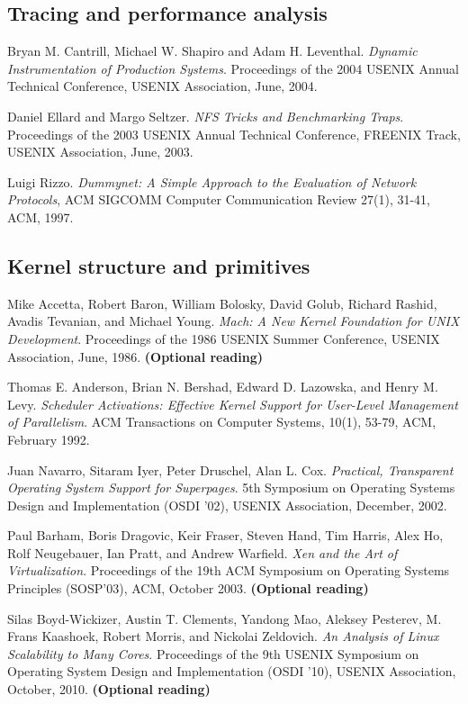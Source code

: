 \documentclass[a4paper,10pt]{article}
\begin{document}
\subsection*{Tracing and performance analysis}

Bryan M. Cantrill, Michael W. Shapiro and Adam H. Leventhal.  \textit{Dynamic
Instrumentation of Production Systems}.  Proceedings of the 2004 USENIX Annual
Technical Conference, USENIX Association, June, 2004.

\medskip
\noindent
Daniel Ellard and Margo Seltzer.  \textit{NFS Tricks and Benchmarking Traps}.
Proceedings of the 2003 USENIX Annual Technical Conference, FREENIX Track,
USENIX Association, June, 2003.

\medskip
\noindent
Luigi Rizzo.  \textit{Dummynet: A Simple Approach to the Evaluation of Network
Protocols}, ACM SIGCOMM Computer Communication Review 27(1), 31-41, ACM, 1997.

\subsection*{Kernel structure and primitives}

Mike Accetta, Robert Baron, William Bolosky, David Golub, Richard Rashid,
Avadis Tevanian, and Michael Young. \textit{Mach: A New Kernel Foundation for
UNIX Development}.  Proceedings of the 1986 USENIX Summer Conference, USENIX
Association, June, 1986.  \textbf{(Optional reading)}

\medskip
\noindent
Thomas E. Anderson, Brian N. Bershad, Edward D. Lazowska, and Henry M. Levy.
\textit{Scheduler Activations: Effective Kernel Support for User-Level
Management of Parallelism}. ACM Transactions on Computer Systems, 10(1),
53-79, ACM, February 1992.

\medskip
\noindent
Juan Navarro, Sitaram Iyer, Peter Druschel, Alan L. Cox.  \textit{Practical,
Transparent Operating System Support for Superpages}.  5th Symposium on
Operating Systems Design and Implementation (OSDI '02), USENIX Association,
December, 2002.

\medskip
\noindent
Paul Barham, Boris Dragovic, Keir Fraser, Steven Hand, Tim Harris, Alex Ho,
Rolf Neugebauer, Ian Pratt, and Andrew Warfield.  \textit{Xen and the Art of
Virtualization}. Proceedings of the 19th ACM Symposium on Operating Systems
Principles (SOSP'03), ACM, October 2003.  \textbf{(Optional reading)}

\medskip
\noindent
Silas Boyd-Wickizer, Austin T. Clements, Yandong Mao, Aleksey Pesterev, M.
Frans Kaashoek, Robert Morris, and Nickolai Zeldovich.  \textit{An Analysis of
Linux Scalability to Many Cores}.  Proceedings of the 9th USENIX Symposium on
Operating System Design and Implementation (OSDI '10), USENIX Association,
October, 2010.  \textbf{(Optional reading)}
\end{document}
